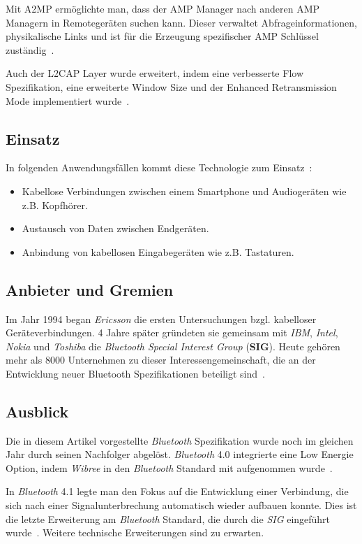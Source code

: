 \begin{multicols}{3}
Mit A2MP ermöglichte man, dass der AMP Manager nach anderen AMP Managern in Remotegeräten suchen kann. Dieser verwaltet Abfrageinformationen, physikalische Links und ist für die Erzeugung spezifischer AMP Schlüssel zuständig~\cite{bluetooth3.0.2}.

Auch der L2CAP Layer wurde erweitert, indem eine verbesserte Flow Spezifikation, eine erweiterte Window Size und der Enhanced Retransmission Mode implementiert wurde~\cite{bluetooth3.0.2}.

\subsection*{Einsatz}
In folgenden Anwendungsfällen kommt diese Technologie zum Einsatz~\cite{bluetooth3.0.1}:
\begin{itemize}
	\item Kabellose Verbindungen zwischen einem Smartphone und Audiogeräten wie z.B. Kopfhörer. 
	\item Austausch von Daten zwischen Endgeräten.
	\item Anbindung von kabellosen Eingabegeräten wie z.B. Tastaturen.
\end{itemize}

\subsection*{Anbieter und Gremien}
Im Jahr 1994 began \textit{Ericsson} die ersten Untersuchungen bzgl. kabelloser Geräteverbindungen. 4 Jahre später gründeten sie gemeinsam mit \textit{IBM}, \textit{Intel}, \textit{Nokia} und \textit{Toshiba} die \textit{Bluetooth Special Interest Group} (\textbf{SIG}). Heute gehören mehr als 8000 Unternehmen zu dieser Interessengemeinschaft, die an der Entwicklung neuer Bluetooth Spezifikationen beteiligt sind~\cite{bluetooth3.0.5}.

\subsection*{Ausblick}
Die in diesem Artikel vorgestellte \textit{Bluetooth} Spezifikation wurde noch im gleichen Jahr durch seinen Nachfolger abgelöst. \textit{Bluetooth} 4.0 integrierte eine Low Energie Option, indem \textit{Wibree} in den \textit{Bluetooth} Standard mit aufgenommen wurde~\cite{bluetooth3.0.1}. 

In \textit{Bluetooth} 4.1 legte man den Fokus auf die Entwicklung einer Verbindung, die sich nach einer Signalunterbrechung automatisch wieder aufbauen konnte. Dies ist die letzte Erweiterung am \textit{Bluetooth} Standard, die durch die \textit{SIG} eingeführt wurde~\cite{bluetooth3.0.1}. Weitere technische Erweiterungen sind zu erwarten. 

\printbibliography[segment=1,heading=subbibliography]
\end{multicols}

\newpage
